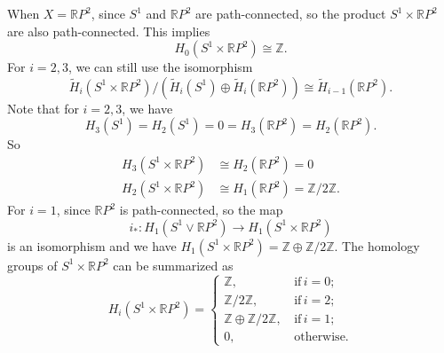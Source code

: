 \documentclass[a4paper, 12pt]{article}
\begin{document}
\begin{solution}
\begin{enumerate}[(a)]
When \(X=\mathbb{R}P^2\), since \(S^1\) and \(\mathbb{R}P^2\) are path-connected, so the product \(S^1\times \mathbb{R}P^2\) are also path-connected. This implies 
\[H_0(S^1\times \mathbb{R}P^2)\cong \mathbb{Z}.\]
For \(i=2,3\), we can still use the isomorphism 
\[\tilde{H}_i(S^1\times \mathbb{R}P^2)/(\tilde{H}_i(S^1)\oplus \tilde{H}_i(\mathbb{R}P^2))\cong \tilde{H}_{i-1}(\mathbb{R}P^2).\]
Note that for \(i=2,3\), we have 
\[H_3(S^1)=H_2(S^1)=0=H_3(\mathbb{R}P^2)=H_2(\mathbb{R}P^2).\]
So 
\begin{align*}
H_3(S^1\times \mathbb{R}P^2)&\cong H_2(\mathbb{R}P^2)=0\\ 
H_2(S^1\times \mathbb{R}P^2)&\cong H_1(\mathbb{R}P^2)=\mathbb{Z}/2 \mathbb{Z}.
\end{align*}
For \(i=1\), since \(\mathbb{R}P^2\) is path-connected, so the map 
\[i_*:H_1(S^1\vee \mathbb{R}P^2)\rightarrow H_1(S^1\times \mathbb{R}P^2)\]
is an isomorphism and we have \(H_1(S^1\times \mathbb{R}P^2)=\mathbb{Z}\oplus \mathbb{Z}/2 \mathbb{Z}\). The homology groups of \(S^1\times \mathbb{R}P^2\) can be summarized as 
\[H_i(S^1\times \mathbb{R}P^2)=\begin{cases}
    \mathbb{Z},&\, \text{if}\, i=0;\\ 
    \mathbb{Z}/2 \mathbb{Z},&\, \text{if}\, i=2;\\ 
    \mathbb{Z}\oplus \mathbb{Z}/2 \mathbb{Z},&\, \text{if}\, i=1;\\ 
    0,&\, \text{otherwise}.
\end{cases}\]
\end{enumerate}
\end{solution}
\end{document}
